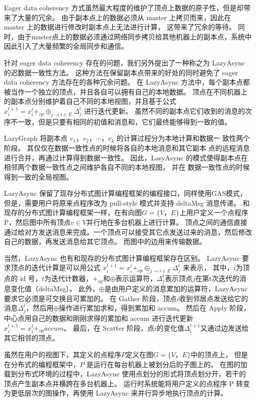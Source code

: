 Eager data coherency 方式虽然最大程度的维护了顶点上数据的原子性，但是却带来了大量的冗余。
由于副本点上的数据必须从 master 上拷贝而来，因此在 master 上的数据进行修改时副本点上无法进行计算，
这带来了冗余的等待。
同时，由于master点上的数据必须通过网络同步拷贝给其他机器上的副本点，系统中因此引入了大量频繁的全局同步和通信。

针对 eager data coherency 存在的问题，我们另外提出了一种称之为 LazyAsync 的迟数据一致性方法。
这种方法在保留副本点带来的好处的同时避免了 eager data coherency 方法存在的各种冗余问题。
在 LazyAsync 方法中，每个副本点都被当作一个独立的顶点，并且各自可以拥有自己的本地数据。
顶点在不同机器上的副本点分别维护着自己不同的本地视图，并且基于公式
$x_{i}^{t+1}=x_{i}^{t}+_{o p} \oplus_{j \rightarrow i \in E} \Delta_{j}^{t}$
进行迭代更新。
虽然不同的副本点它们收到的消息的次序不一致，但是只要有相同的初值和消息和，它们最终能够得到一致的值。

LazyGraph 将副本点 $v_1，v_2，\cdots，v_k$ 的计算过程分为本地计算和数据一 致性两个阶段。
其仅仅在数据一致性点的时候将各自的本地消息和其它副本 点的远程消息进行合并，再通过计算得到数据一致性。
因此，LasyAsync 的模式使得副本点在相邻两个数据一致性点之间维护各自不同的本地视图，
并在 数据一致性点的时候得到一致的全局视图。


LazyAsync 保留了现存分布式图计算编程框架的编程接口，同样使用GAS模式，
但是，需要用户将原来点程序改为 pull-style 模式并支持 deltaMsg 消息传递。
和现存的分布式图计算编程框架一样，在有向图$G = \{V， E\}$上用户定义一个点程序 P，然后图中所有顶点$v \in V$并行地在多台机器上进行计算。
顶点之间的通信直接通过给对方发送消息来完成。一个顶点可以接受其它点发送过来的消息，然后修改自己的数据，再发送消息给其它顶点。
而图中的边用来传输数据。


当然，LazyAsync 也有和现存的分布式图计算编程框架存在区别。
LazyAsync 要求顶点的迭代计算是可以用公式 $x_i^{t+1} = x_i^t +_{op} \oplus_{j \rightarrow i \in E} \Delta_j^t$ 来表示，
其中，$i$为顶点的 id 号，$t$为迭代计数器，$+_{op}$和$\oplus$表示运算符，$\Delta_j^t$表示顶点$j$在第t次迭代的消息变化值（deltaMsg）。
此外，$\oplus$是由用户定义的消息累加的运算符，LazyAsync 要求它必须是可交换且可累加的。
在 Gather 阶段，顶点$i$收到邻居点发送给它的消息$\Delta_j^t$，然后用$\oplus$操作进行累加求和，得到累加和 accum。
然后在 Apply 阶段，中心点用自己的数据和刚刚求得的累加和 accum 进行迭代更新$x_i^{t+1} = x_i^t +_{op} accum$。
最后，在 Scatter 阶段，点$i$的变化值$\Delta_i^{t+1}$又通过边发送给其它相邻的顶点。


虽然在用户的视图下，其定义的点程序$P$定义在图$G = \{V， E\}$中的顶点上，
但是在分布式的编程框架中，$P$ 是运行在每台机器上被划分后的子图上的。
在图的加载到分布式环境的过程中，LazyAsync 使用点划分的形式将顶点划分开，若干的顶点产生副本点并横跨在多台机器上。
运行时系统能将用户定义的点程序 P 转变为更低层次的图操作，再使用 LazyAsync 来并行异步地执行顶点的计算。

